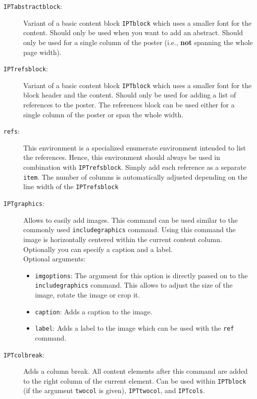 \begin{description}
	\item[\texttt{IPTabstractblock}:] Variant of a basic content block \texttt{IPTblock} which uses a smaller font for the content. Should only be used when you want to add an abstract. Should only be used for a single column of the poster (i.e., \textbf{not} spanning the whole page width).

	\item[\texttt{IPTrefsblock}:] Variant of a basic content block \texttt{IPTblock} which uses a smaller font for the block header and the content. Should only be used for adding a list of references to the poster. The references block can be used either for a single column of the poster or span the whole width.


	\item[\texttt{refs}:] This environment is a specialized enumerate environment intended to list the references. Hence, this environment should always be used in combination with \texttt{IPTrefsblock}. Simply add each reference as a separate \texttt{\bs{}item}. The number of columns is automatically adjusted depending on the line width of the \texttt{\bs{}IPTrefsblock}\\

	\item[\texttt{\bs{}IPTgraphics}:] Allows to easily add images. This command can be used similar to the commonly used \texttt{includegraphics} command. Using this command the image is horizontally centered within the current content column. Optionally you can specify a caption and a label.\\
	Optional arguments:
	\begin{itemize}
		\item \texttt{imgoptions}: The argument for this option is directly passed on to the \texttt{includegraphics} command. This allows to adjust the size of the image, rotate the image or crop it.
		\item \texttt{caption}: Adds a caption to the image.
		\item \texttt{label}: Adds a label to the image which can be used with the \texttt{ref} command.
	\end{itemize}


	\item[\texttt{\bs{}IPTcolbreak}:] Adds a column break. All content elements after this command are added to the right column of the current element. Can be used within \texttt{IPTblock} (if the argument \texttt{twocol} is given), \texttt{IPTtwocol}, and \texttt{IPTcols}.


\end{description}
